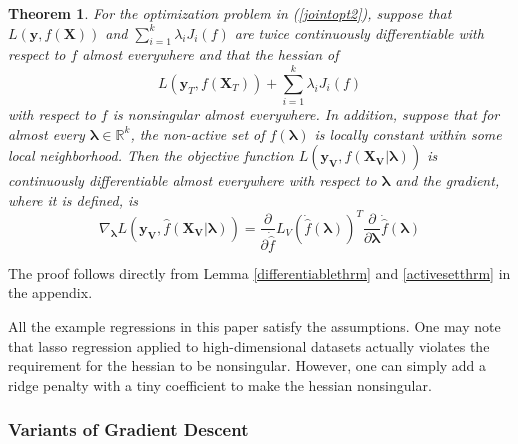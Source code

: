 \documentclass[10pt,letterpaper]{article}
\newtheorem{theorem}{Theorem}
\begin{document}

\begin{theorem}
For the optimization problem in (\ref{jointopt2}), suppose that $L(\boldsymbol{y}, f(\boldsymbol{X}))$ and
$\sum\limits_{i=1}^k \lambda_i J_i(f)$ are twice continuously differentiable with respect to $f$ almost everywhere and that the hessian of
\begin{equation}
L(\boldsymbol{y}_T, f (\boldsymbol{X}_T)) + \sum\limits_{i=1}^k \lambda_i J_i(f)
\end{equation}
with respect to $f$ is nonsingular almost everywhere. In addition, suppose that for almost every $\boldsymbol{\lambda} \in \mathbb{R}^k$, the non-active set of $\hat f(\boldsymbol{\lambda})$ is locally constant within some local neighborhood. Then the objective function $L(\boldsymbol{y_V}, \hat f(\boldsymbol{X_V} | \boldsymbol{\lambda}))$ is continuously differentiable almost everywhere with respect to $\boldsymbol{\lambda}$ and the gradient, where it is defined, is
\begin{equation}
\nabla_{\boldsymbol{\lambda}} L(\boldsymbol{y_V}, \hat f(\boldsymbol{X_V} | \boldsymbol{\lambda})) = \frac{\partial}{\partial \dot{\hat{f}}} L_V(\dot{\hat{f}}(\boldsymbol{\lambda}))^T \frac{\partial}{\partial \boldsymbol{\lambda}} \dot{\hat{f}}(\boldsymbol{\lambda})
\end{equation}

\label{thethrm}
\end{theorem}

The proof follows directly from Lemma \ref{differentiablethrm} and \ref{activesetthrm} in the appendix.

All the example regressions in this paper satisfy the assumptions. One may note that lasso regression applied to high-dimensional datasets actually violates the requirement for the hessian to be nonsingular. However, one can simply add a ridge penalty with a tiny coefficient to make the hessian nonsingular.

\subsubsection{Variants of Gradient Descent}
\end{document}
